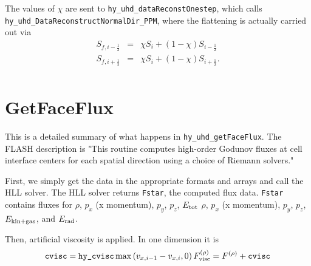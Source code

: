 \documentclass[preprint,11pt]{aastex}
\newcommand{\bea}{\begin{eqnarray}}
\newcommand{\eea}{\end{eqnarray}}
\begin{document}
The values of $\chi$ are sent to \verb!hy_uhd_dataReconstOnestep!, which calls \verb!hy_uhd_DataReconstructNormalDir_PPM!, where the flattening is actually carried out via
\bea
S_{f,i-\frac{1}{2}} &=& \chi S_i + (1 - \chi) S_{i-\frac{1}{2}}  \\
S_{f,i+\frac{1}{2}} &=& \chi S_i + (1 - \chi) S_{i+\frac{1}{2}}. \\
\eea

\section{GetFaceFlux}
\label{sec:getfaceflux}
This is a detailed summary of what happens in \verb!hy_uhd_getFaceFlux!.  The FLASH description is "This routine computes high-order Godunov fluxes at cell interface centers for each spatial direction using a choice of Riemann solvers."

First, we simply get the data in the appropriate formats and arrays and call the HLL solver.  The HLL solver returns \verb!Fstar!, the computed flux data.  \verb!Fstar! contains fluxes for {\color{red}$\rho$, $p_x$ (x momentum), $p_y$, $p_z$, $E_{\rm tot}$} {\color{blue}$\rho$, $p_x$ (x momentum), $p_y$, $p_z$, $E_{\rm kin+gas}$, and $E_{\rm rad}$}.

Then, artificial viscosity is applied.  In one dimension it is
\bea
\verb!cvisc! = \verb!hy_cvisc! \max\left(v_{x,i-1} - v_{x,i},0 \right)
F^{(\rho)}_{\rm visc} = F^{(\rho)} + \verb!cvisc! 
\eea
\end{document}
